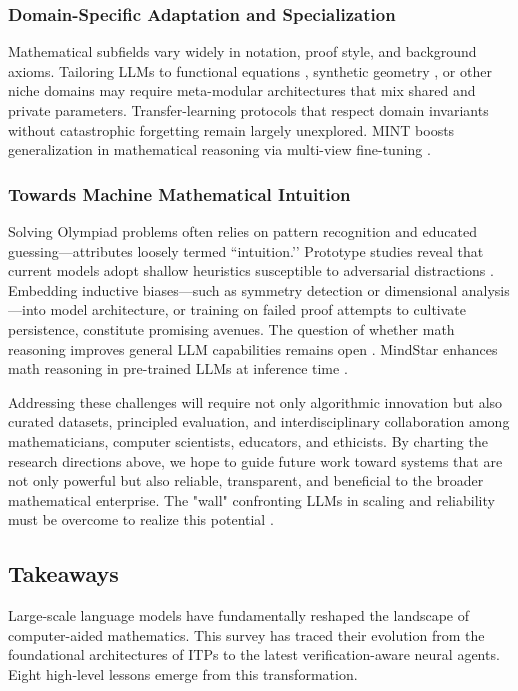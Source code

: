 \documentclass[acmsmall,anonymous]{acmart}
\begin{document}
\subsubsection{Domain-Specific Adaptation and Specialization}\label{sec:domainspecific}
Mathematical subfields vary widely in notation, proof style, and background axioms.  Tailoring LLMs to functional equations \cite{buali2024towards}, synthetic geometry \cite{sinha2024wusmethod}, or other niche domains may require meta-modular architectures that mix shared and private parameters.  Transfer-learning protocols that respect domain invariants without catastrophic forgetting remain largely unexplored. MINT boosts generalization in mathematical reasoning via multi-view fine-tuning \cite{liang2023b}.

\subsubsection{Towards Machine Mathematical Intuition}\label{sec:intuitionfuture}
Solving Olympiad problems often relies on pattern recognition and educated guessing—attributes loosely termed “intuition.’’  Prototype studies reveal that current models adopt shallow heuristics susceptible to adversarial distractions \cite{li2024mindstar}.  Embedding inductive biases—such as symmetry detection or dimensional analysis—into model architecture, or training on failed proof attempts to cultivate persistence, constitute promising avenues. The question of whether math reasoning improves general LLM capabilities remains open \cite{anonymous2025doesmath}. MindStar enhances math reasoning in pre-trained LLMs at inference time \cite{kang2024}.

\bigskip
Addressing these challenges will require not only algorithmic innovation but also curated datasets, principled evaluation, and interdisciplinary collaboration among mathematicians, computer scientists, educators, and ethicists.  By charting the research directions above, we hope to guide future work toward systems that are not only powerful but also reliable, transparent, and beneficial to the broader mathematical enterprise. The "wall" confronting LLMs in scaling and reliability must be overcome to realize this potential \cite{anonymous2025wall}.


\subsection{Takeaways}\label{sec:takeaways}

Large-scale language models have fundamentally reshaped the landscape of computer-aided mathematics.  This survey has traced their evolution from the foundational architectures of ITPs to the latest verification-aware neural agents.  Eight high-level lessons emerge from this transformation.
\end{document}
